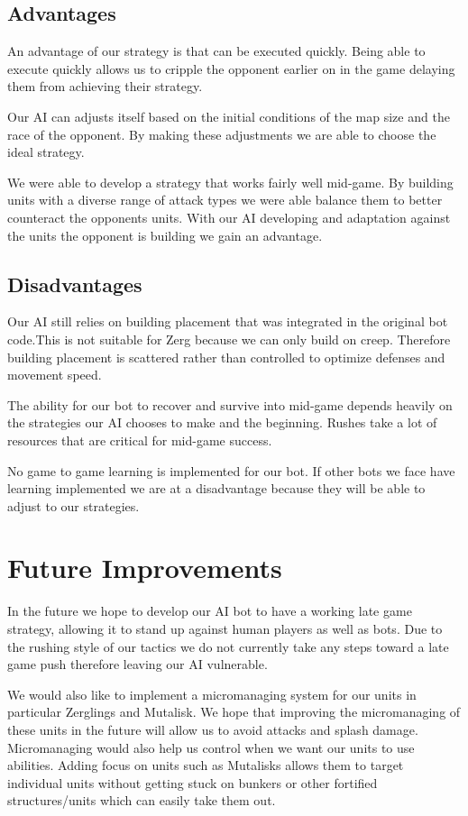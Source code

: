 \documentclass{article}
\begin{document}
\subsection{Advantages}
An advantage of our strategy is that can be executed quickly. Being able to execute quickly allows us to cripple the opponent earlier on in the game delaying them from achieving their strategy.

Our AI can adjusts itself based on the initial conditions of the map size and the race of the opponent. By making these adjustments we are able to choose the ideal strategy.

We were able to develop a strategy that works fairly well mid-game. By building units with a diverse range of attack types we were able balance them to better counteract the opponents units. With our AI developing and adaptation against the units the opponent is building we gain an advantage.

\subsection{Disadvantages}
Our AI still relies on building placement that was integrated in the original bot code.This is not suitable for Zerg because we can only build on creep. Therefore building placement is scattered rather than controlled to optimize defenses and movement speed.

The ability for our bot to recover and survive into mid-game depends heavily on the strategies our AI chooses to make and the beginning. Rushes take a lot of resources that are critical for mid-game success.

No game to game learning is implemented for our bot. If other bots we face have learning implemented we are at a disadvantage because they will be able to adjust to our strategies.

\section{Future Improvements}

In the future we hope to develop our AI bot to have a working late game strategy, allowing it to stand up against human players as well as bots. Due to the rushing style of our tactics we do not currently take any steps toward a late game push therefore leaving our AI vulnerable. 

We would also like to implement a micromanaging system for our units in particular Zerglings and Mutalisk. We hope that improving the micromanaging of these units in the future will allow us to avoid attacks and splash damage. Micromanaging would also help us control when we want our units to use abilities. Adding focus on units such as Mutalisks allows them to target individual units without getting stuck on bunkers or other fortified structures/units which can easily take them out.
\end{document}
